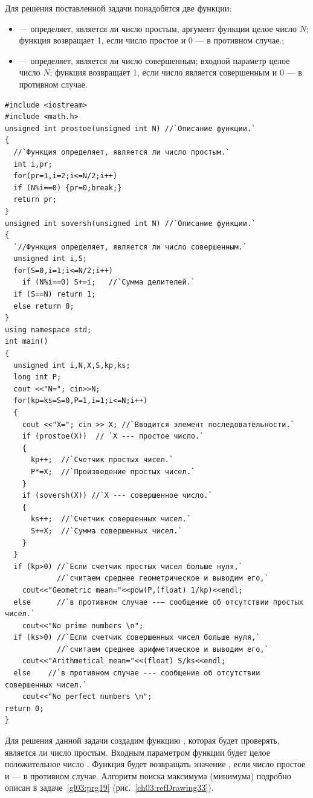 Для решения поставленной задачи понадобятся две функции: 
\begin{itemize}
\item {} --- определяет, является ли число простым, аргумент функции целое число
$N$; функция возвращает 1, если число простое и 0 --- в противном
случае.;

\item {} --- определяет, является ли число совершенным; входной параметр целое число
$N$; функция возвращает 1, если число является совершенным и 0 --- в
противном случае.
\end{itemize}
\begin{lstlisting}
#include <iostream>
#include <math.h>
unsigned int prostoe(unsigned int N) //`Описание функции.`
{
  //`Функция определяет, является ли число простым.`
  int i,pr;
  for(pr=1,i=2;i<=N/2;i++)
  if (N%i==0) {pr=0;break;}
  return pr;
}
unsigned int soversh(unsigned int N) //`Описание функции.`
{
  `//Функция определяет, является ли число совершенным.`
  unsigned int i,S;
  for(S=0,i=1;i<=N/2;i++)
    if (N%i==0) S+=i; 	//`Сумма делителей.`
  if (S==N) return 1;
  else return 0;
}
using namespace std;
int main()
{
  unsigned int i,N,X,S,kp,ks;
  long int P;
  cout <<"N="; cin>>N;
  for(kp=ks=S=0,P=1,i=1;i<=N;i++)
  {
    cout <<"X="; cin >> X; //`Вводится элемент последовательности.`
    if (prostoe(X))  // `X --- простое число.`		
    {
      kp++;  //`Счетчик простых чисел.`
      P*=X;  //`Произведение простых чисел.`
    }
    if (soversh(X)) //`X --- совершенное число.`
    {
      ks++;  //`Счетчик совершенных чисел.`
      S+=X;  //`Сумма совершенных чисел.`
    }
  }
  if (kp>0) //`Если счетчик простых чисел больше нуля,`
            //`считаем среднее геометрическое и выводим его,`
    cout<<"Geometric mean="<<pow(P,(float) 1/kp)<<endl;
  else      //`в противном случае --– сообщение об отсутствии простых чисел.`
    cout<<"No prime numbers \n";
  if (ks>0) //`Если счетчик совершенных чисел больше нуля,` 
            //`считаем среднее арифметическое и выводим его,`
    cout<<"Arithmetical mean="<<(float) S/ks<<endl;
  else    //`в противном случае --- сообщение об отсутствии совершенных чисел.`
    cout<<"No perfect numbers \n";
return 0;
}
\end{lstlisting}


Для решения данной задачи создадим функцию , которая будет проверять, является ли число
 простым. Входным параметром функции будет целое положительное число . Функция
будет возвращать значение , если число простое и  --- в противном случае.
Алгоритм поиска максимума (минимума) подробно описан в задаче~\ref{gl03:prg19} (рис.~\ref{ch03:refDrawing33}).

